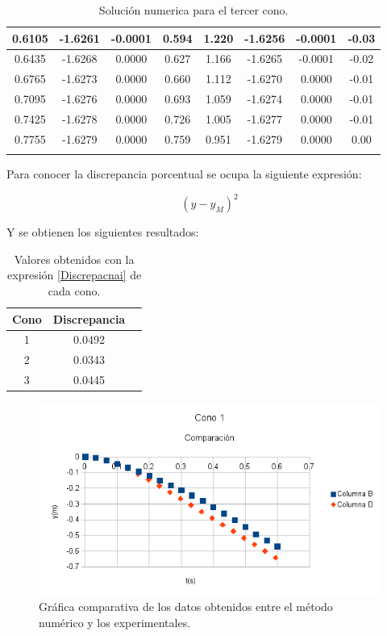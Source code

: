 \begin{longtable}{|c|c|c|c|c|c|c|c|}
    \hline 0.6105 & -1.6261 & -0.0001 & 0.594 & 1.220 & -1.6256 & -0.0001 & -0.03 \\
    \hline 0.6435 & -1.6268 & 0.0000 & 0.627 & 1.166 & -1.6265 & -0.0001 & -0.02 \\
    \hline 0.6765 & -1.6273 & 0.0000 & 0.660 & 1.112 & -1.6270 & 0.0000 & -0.01 \\
    \hline 0.7095 & -1.6276 & 0.0000 & 0.693 & 1.059 & -1.6274 & 0.0000 & -0.01 \\
    \hline 0.7425 & -1.6278 & 0.0000 & 0.726 & 1.005 & -1.6277 & 0.0000 & -0.01 \\
    \hline 0.7755 & -1.6279 & 0.0000 & 0.759 & 0.951 & -1.6279 & 0.0000 & 0.00 \\
    \hline
    \caption{Solución numerica para el tercer cono.}
    \label{tab:Cono3}
\end{longtable}

Para conocer la discrepancia porcentual se ocupa la siguiente expresión:

\begin{equation}
    \left( y - y_M \right)^2
    \label{Discrepacnai}
\end{equation}

Y se obtienen los siguientes resultados:

\begin{table}[h]
    \centering
    \begin{tabular}{|c|c|c|}
        \hline
        \rowcolor{azulito} Cono & Discrepancia \\
        \hline 1    & 0.0492 \\
        \hline 2    & 0.0343 \\
        \hline 3    & 0.0445 \\
        \hline
    \end{tabular}
    \caption{Valores obtenidos con la expresión \ref{Discrepacnai} de cada cono.}
    \label{tab:Discrepancias}
\end{table}

\begin{figure}[h!]
    \centering
    \includegraphics{cono1}
    \caption{Gráfica comparativa de los datos obtenidos entre el método
    numérico y los experimentales.}
    \label{fig:Cono1}
\end{figure}

